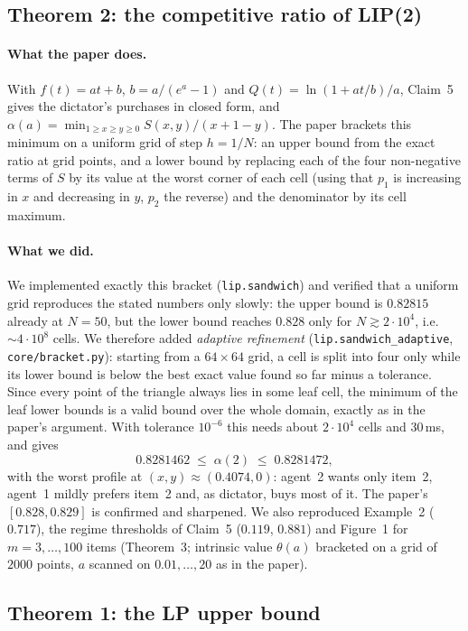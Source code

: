\documentclass{article}
\begin{document}
\subsection{Theorem 2: the competitive ratio of LIP(2)}

\paragraph{What the paper does.} With $f(t)=at+b$, $b=a/(e^a-1)$ and $Q(t)=\ln(1+at/b)/a$, Claim~5
gives the dictator's purchases in closed form, and $\alpha(a)=\min_{1\ge x\ge y\ge0}S(x,y)/(x+1-y)$.
The paper brackets this minimum on a uniform grid of step $h=1/N$: an upper bound from the exact
ratio at grid points, and a lower bound by replacing each of the four non-negative terms of
$S$ by its value at the worst corner of each cell (using that $p_1$ is increasing in $x$ and
decreasing in $y$, $p_2$ the reverse) and the denominator by its cell maximum.

\paragraph{What we did.} We implemented exactly this bracket (\texttt{lip.sandwich}) and
verified that a uniform grid reproduces the stated numbers only slowly: the upper bound is
$0.82815$ already at $N=50$, but the lower bound reaches $0.828$ only for $N\gtrsim 2\cdot10^4$,
i.e. $\sim4\cdot10^8$ cells. We therefore added \emph{adaptive refinement}
(\texttt{lip.sandwich\_adaptive}, \texttt{core/bracket.py}): starting from a $64\times64$ grid, a
cell is split into four only while its lower bound is below the best exact value found so far
minus a tolerance. Since every point of the triangle always lies in some leaf cell, the minimum
of the leaf lower bounds is a valid bound over the whole domain, exactly as in the paper's
argument. With tolerance $10^{-6}$ this needs about $2\cdot10^4$ cells and 30\,ms, and gives
\[
0.8281462\;\le\;\alpha(2)\;\le\;0.8281472,
\]
with the worst profile at $(x,y)\approx(0.4074,0)$: agent~2 wants only item~2, agent~1 mildly
prefers item~2 and, as dictator, buys most of it. The paper's $[0.828,0.829]$ is confirmed and
sharpened. We also reproduced Example~2 ($0.717$), the regime thresholds of Claim~5
($0.119$, $0.881$) and Figure~1 for $m=3,\ldots,100$ items (Theorem~3; intrinsic value $\theta(a)$
bracketed on a grid of $2000$ points, $a$ scanned on $0.01,\ldots,20$ as in the paper).

\subsection{Theorem 1: the LP upper bound}
\end{document}
